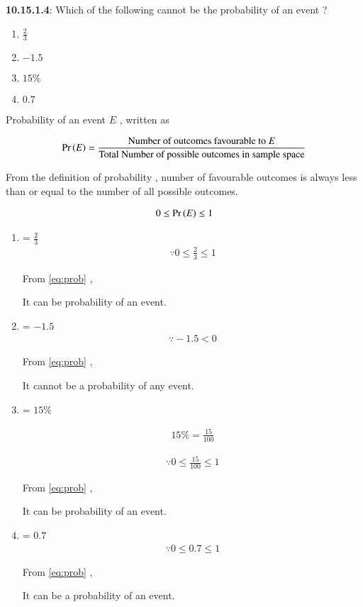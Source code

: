 \documentclass[journal,12pt,twocolumn]{IEEEtran}
\begin{document}
\textbf{10.15.1.4}:
 Which of the following cannot be the probability of an event ? 

\begin{enumerate}[label=(\Alph*)]
\item $\frac{2}{3}$ 
\item $-1.5$ 
\item $15\%$ 
\item $0.7$ 
\end{enumerate}


\solution

Probability of an event $E$ , written as \:

\begin{align}
\label{eq:def}
\Pr\left(E\right)=\frac{\text{Number of outcomes favourable to $E$}}{\text{Total Number of possible outcomes in sample space}}
\end{align}


From the definition of probability , number of favourable outcomes is always less than or equal to the number of all possible outcomes.


\begin{align}
   \label{eq:prob}
   0 \le \Pr\left(E\right)\le 1 
\end{align}
\begin{enumerate}[label=(\Alph*)]
    

\item {} = $\frac{2}{3}$
\begin{align}
    \because 0 \le \frac{2}{3} \le 1
\end{align}

From \eqref{eq:prob} ,

 It can be probability of an event.

\item {} = $-1.5$
\begin{align}
\because  -1.5 < 0 
\end{align}

From \eqref{eq:prob} ,

It cannot be a probability of any event.

\item {} = $15\%$

\begin{align}
15\%=\frac{15}{100}
\end{align}

\begin{align}
\because 0 \le \frac{15}{100} \le 1
\end{align}

From \eqref{eq:prob} ,

It can be probability of an event.

\item {} = $0.7$ 
\begin{align}
\because 0 \le 0.7 \le 1 
\end{align}

From \eqref{eq:prob} ,

It can be a probability of an event.
\end{enumerate}
\end{document}
